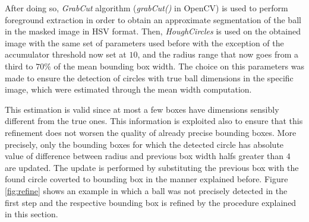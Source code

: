 After doing so, \textit{GrabCut} algorithm (\textit{grabCut()} in OpenCV) is used to perform foreground extraction in order to obtain an approximate segmentation of the ball in the masked image in HSV format. 
Then, \textit{HoughCircles} is used on the obtained image with the same set of parameters used before with the exception of the accumulator threshold now set at $10$, and
the radius range that now goes from a third to $70\%$ of the mean bounding box width. The choice on this parameters was made to ensure the detection of circles with true ball dimensions
in the specific image, which were estimated through the mean width computation.

This estimation is valid since at most a few boxes have dimensions sensibly different from the true ones. This information is exploited also to ensure that this refinement
does not worsen the quality of already precise bounding boxes. More precisely, only the bounding boxes for which the detected circle has absolute value of difference between radius and previous box
width halfs greater than $4$ are updated. The update is performed by substituting the previous box with the found circle coverted to bounding box in the manner explained before.
Figure \ref{fig:refine} shows an example in which a ball was not precisely detected in the first step and the respective bounding box is refined by the procedure explained in this section. \\
